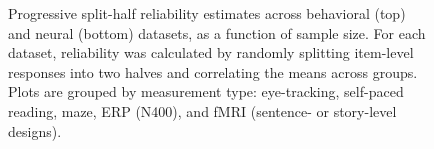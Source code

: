 \begin{figure}[htp]
\begin{center}
{}
\end{center}
\caption{Progressive split-half reliability estimates across behavioral (top) and neural (bottom) datasets, as a function of sample size. For each dataset, reliability was calculated by randomly splitting item-level responses into two halves and correlating the means across groups. Plots are grouped by measurement type: eye-tracking, self-paced reading, maze, ERP (N400), and fMRI (sentence- or story-level designs).}
\label{fig:reliability-by-size}

\end{figure}
